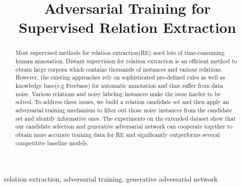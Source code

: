 \documentclass[conference]{IEEEtran}
\begin{document}
\title{Adversarial Training for Supervised Relation Extraction}

\author{
\and
{}
\and
{}
}

\maketitle

\begin{abstract}
  Most supervised methods for relation extraction(RE) need lots of time-consuming human annotation.
Distant supervision for relation extraction is an efficient method to obtain large corpora which contains thousands of instances and various relations.
However, the existing approaches rely on sophisticated pre-defined rules as well as knowledge base(e.g Freebase) for automatic annotation and thus suffer from data noise.
Various relations and noisy labeling instances make the issue harder to be solved.
To address these issues, we build a relation candidate set and then apply an adversarial training mechanism to filter out those noisy instances from the candidate set and identify informative ones.
The experiments on the extended dataset show that our candidate selection and generative adversarial network can cooperate together to obtain more accurate training data for RE and significantly outperforms several competitive baseline models. 
\end{abstract}

\begin{IEEEkeywords}
relation extraction, adversarial training, generative adversarial network
\end{IEEEkeywords}
\end{document}
